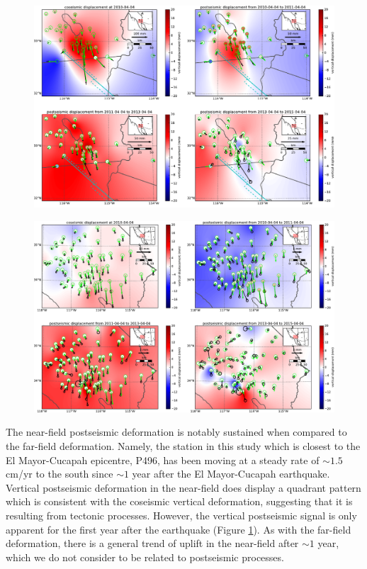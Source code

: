 \documentclass[review]{elsarticle}
\begin{document}
\begin{figure}
\includegraphics[scale=0.7]{Figures/MapViewNearField}
\centering 
\caption{}
\label{fig:NearField}
\end{figure}

\begin{figure}
\includegraphics[scale=0.7]{Figures/MapViewFarField}
\centering 
\caption{}
\label{fig:FarField}
\end{figure}

The near-field postseismic deformation is notably sustained when compared to the far-field deformation.  Namely, the station in this study which is closest to the El Mayor-Cucapah epicentre, P496, has been moving at a steady rate of $\sim1.5$ cm/yr to the south since $\sim1$ year after the El Mayor-Cucapah earthquake.  Vertical postseismic deformation in the near-field does display a quadrant pattern which is consistent with the coseismic vertical deformation, suggesting that it is resulting from tectonic processes.  However, the vertical postseismic signal is only apparent for the first year after the earthquake (Figure \ref{fig:NearField}).  As with the far-field deformation, there is a general trend of uplift in the near-field after $\sim1$ year, which we do not consider to be related to postseismic processes.  
\end{document}
